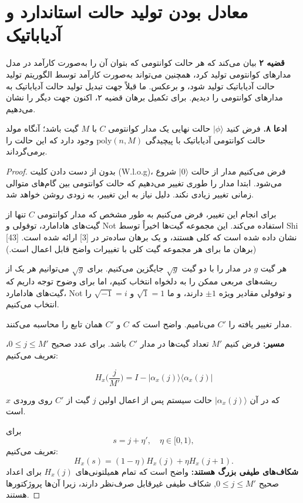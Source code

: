 \section{ معادل بودن تولید حالت استاندارد و آدیاباتیک}
\textbf{قضیه ۲}
بیان می‌کند که هر حالت کوانتومی که بتوان آن را به‌صورت کارآمد در مدل مدارهای کوانتومی تولید کرد، همچنین می‌تواند به‌صورت کارآمد توسط الگوریتم تولید حالت آدیاباتیک تولید شود، و برعکس.  
ما قبلاً جهت تبدیل تولید حالت آدیاباتیک به مدارهای کوانتومی را دیدیم. برای تکمیل برهان قضیه ۲، اکنون جهت دیگر را نشان می‌دهیم.

\textbf{ادعا ۸.}
 فرض کنید $|\phi\rangle$ حالت نهایی یک مدار کوانتومی $C$ با $M$ گیت باشد؛ آنگاه مولد حالت کوانتومی آدیاباتیک با پیچیدگی $\mathrm{poly}(n, M)$ وجود دارد که این حالت را برمی‌گرداند. 
 
 \begin{proof}
 بدون از دست دادن کلیت (W.l.o.g)، فرض می‌کنیم مدار از حالت $|0\rangle$ شروع می‌شود. ابتدا مدار را طوری تغییر می‌دهیم که حالت کوانتومی بین گام‌های متوالی زمانی تغییر زیادی نکند. دلیل نیاز به این تغییر، به زودی روشن خواهد شد.  
 
 برای انجام این تغییر، فرض می‌کنیم به طور مشخص که مدار کوانتومی $C$ تنها از گیت‌های هادامارد، توفولی و Not استفاده می‌کند. این مجموعه گیت‌ها اخیراً توسط Shi [43] نشان داده شده است که کلی هستند، و یک برهان ساده‌تر در [3] ارائه شده است. (برهان ما برای هر مجموعه گیت کلی با تغییرات واضح قابل اعمال است.)  
 
 هر گیت $g$ در مدار را با دو گیت $\sqrt{g}$ جایگزین می‌کنیم. برای $\sqrt{g}$ می‌توانیم هر یک از ریشه‌های مربعی ممکن را به دلخواه انتخاب کنیم، اما برای وضوح توجه داریم که گیت‌های هادامارد، Not و توفولی مقادیر ویژه $\pm 1$ دارند، و ما $\sqrt{1} = 1$ و $\sqrt{-1} = i$ را انتخاب می‌کنیم.  
 
 مدار تغییر یافته را $C'$ می‌نامیم. واضح است که $C$ و $C'$ همان تابع را محاسبه می‌کنند.
 
 \textbf{مسیر:}  
 فرض کنیم $M'$ تعداد گیت‌ها در مدار $C'$ باشد. برای عدد صحیح $0 \le j \le M'$، تعریف می‌کنیم:  
 
 \[
 H_x\Big(\frac{j}{M'}\Big) = I - |\alpha_x(j)\rangle\langle \alpha_x(j)|
 \]  
 
 که در آن $|\alpha_x(j)\rangle$ حالت سیستم پس از اعمال اولین $j$ گیت از $C'$ روی ورودی $x$ است.  
 
 برای  
 \[
 s = j + \eta', \quad \eta \in [0,1),
 \]  
 تعریف می‌کنیم:  
 \[
 H_x(s) = (1 - \eta) H_x(j) + \eta H_x(j+1).
 \]  
 \textbf{شکاف‌های طیفی بزرگ هستند:}  
 واضح است که تمام همیلتونی‌های $H_x(j)$ برای اعداد صحیح $0 \le j \le M'$, شکاف طیفی غیرقابل صرف‌نظر دارند، زیرا آن‌ها پروژکتورها هستند.  
 

\end{proof}
